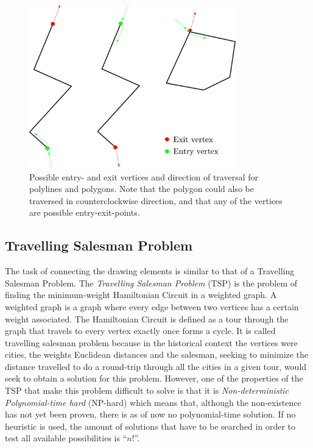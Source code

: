 \begin{figure}
\centering
\includegraphics[width=0.8\textwidth]{images/path_planning/traversal.pdf}
\caption{Possible entry- and exit vertices and direction of traversal for polylines and polygons. Note that the polygon could also be traversed in counterclockwise direction, and that any of the vertices are possible entry-exit-points.}\label{fig:connect}
\end{figure}

\subsection{Travelling Salesman Problem}

The task of connecting the drawing elements is similar to that of a Travelling Salesman Problem.
The \textit{Travelling Salesman Problem} (TSP) is the problem of finding the minimum-weight Hamiltonian Circuit in a weighted graph. A weighted graph is a graph where every edge between two vertices has a certain weight associated. The Hamiltonian Circuit is defined as a tour through the graph that travels to every vertex exactly once forms a cycle. It is called travelling salesman problem because in the historical context the vertices were cities, the weights Euclidean distances and the salesman, seeking to minimize the distance travelled to do a round-trip through all the cities in a given tour, would seek to obtain a solution for this problem. However, one of the properties of the TSP that make this problem difficult to solve is that it is \textit{Non-deterministic Polynomial-time hard} (NP-hard) which means that, although the non-existence has not yet been proven, there is as of now no polynomial-time solution. If no heuristic is used, the amount of solutions that have to be searched in order to test all available possibilities is \enquote{$n!$}.

